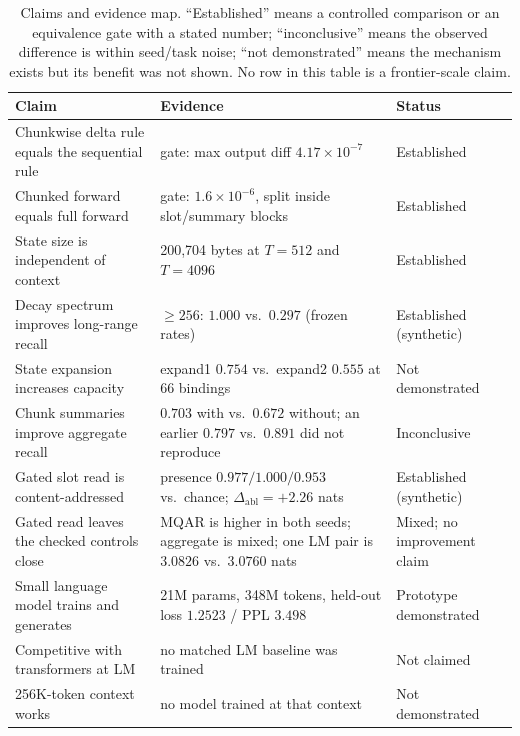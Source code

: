 \begin{table}[t]
\centering
\caption{Claims and evidence map. ``Established'' means a controlled comparison or an
equivalence gate with a stated number; ``inconclusive'' means the observed difference is within
seed/task noise; ``not demonstrated'' means the mechanism exists but its benefit was not shown.
No row in this table is a frontier-scale claim.}
\label{tab:claims}
\small
\begin{tabularx}{\textwidth}{@{}l X l@{}}
\toprule
Claim & Evidence & Status \\
\midrule
Chunkwise delta rule equals the sequential rule & gate: max output diff $4.17\times10^{-7}$ & Established \\
Chunked forward equals full forward & gate: $1.6\times10^{-6}$, split inside slot/summary blocks & Established \\
State size is independent of context & 200{,}704 bytes at $T=512$ and $T=4096$ & Established \\
Decay spectrum improves long-range recall & $\geq256$: $1.000$ vs.\ $0.297$ (frozen rates) & Established (synthetic) \\
State expansion increases capacity & expand1 $0.754$ vs.\ expand2 $0.555$ at 66 bindings & Not demonstrated \\
Chunk summaries improve aggregate recall & $0.703$ with vs.\ $0.672$ without; an earlier $0.797$ vs.\ $0.891$ did not reproduce & Inconclusive \\
Gated slot read is content-addressed & presence $0.977/1.000/0.953$ vs.\ chance; $\Delta_{\mathrm{abl}}=+2.26$ nats & Established (synthetic) \\
Gated read leaves the checked controls close & MQAR is higher in both seeds; aggregate is mixed; one LM pair is $3.0826$ vs.\ $3.0760$ nats & Mixed; no improvement claim \\
Small language model trains and generates & 21M params, 348M tokens, held-out loss $1.2523$ / PPL $3.498$ & Prototype demonstrated \\
Competitive with transformers at LM & no matched LM baseline was trained & Not claimed \\
256K-token context works & no model trained at that context & Not demonstrated \\
\bottomrule
\end{tabularx}
\end{table}
